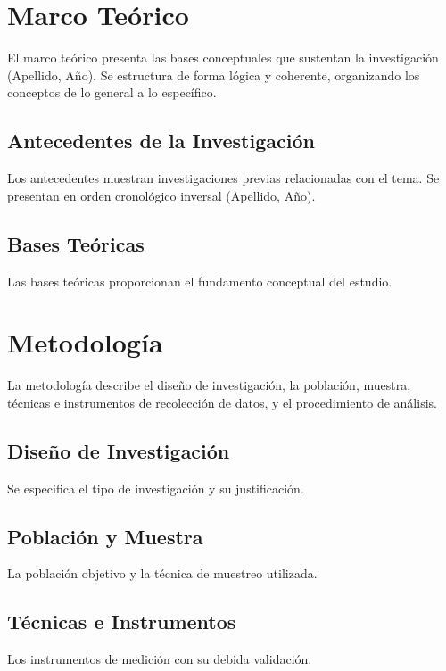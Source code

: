 \documentclass[12pt, a4paper, oneside]{article}
\begin{document}
\section*{Marco Teórico}
El marco teórico presenta las bases conceptuales que sustentan la
investigación (Apellido, Año). Se estructura de forma lógica y
coherente, organizando los conceptos de lo general a lo específico.

\subsection*{Antecedentes de la Investigación}
Los antecedentes muestran investigaciones previas relacionadas con
el tema. Se presentan en orden cronológico inversal (Apellido, Año).

\subsection*{Bases Teóricas}
Las bases teóricas proporcionan el fundamento conceptual del estudio.

\section*{Metodología}
La metodología describe el diseño de investigación, la población,
muestra, técnicas e instrumentos de recolección de datos, y el
procedimiento de análisis.

\subsection*{Diseño de Investigación}
Se especifica el tipo de investigación y su justificación.

\subsection*{Población y Muestra}
La población objetivo y la técnica de muestreo utilizada.

\subsection*{Técnicas e Instrumentos}
Los instrumentos de medición con su debida validación.
\end{document}
